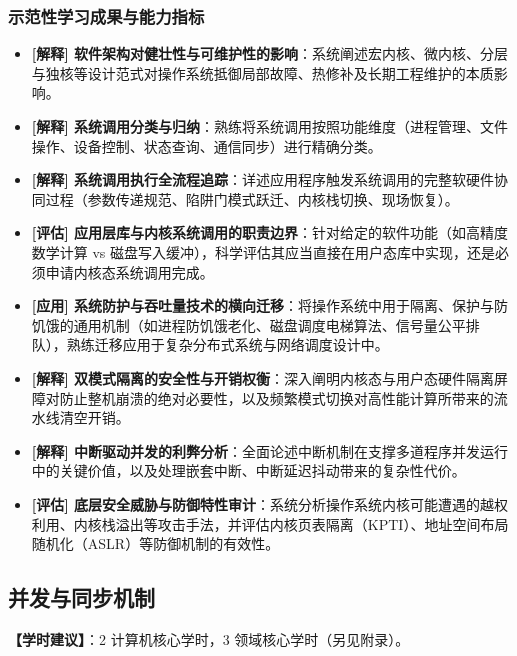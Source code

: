 \subsubsection{示范性学习成果与能力指标}
\begin{itemize}\setlength{\itemsep}{0pt}\setlength{\parskip}{0pt}
    \item \textbf{[解释] 软件架构对健壮性与可维护性的影响}：系统阐述宏内核、微内核、分层与独核等设计范式对操作系统抵御局部故障、热修补及长期工程维护的本质影响。
    \item \textbf{[解释] 系统调用分类与归纳}：熟练将系统调用按照功能维度（进程管理、文件操作、设备控制、状态查询、通信同步）进行精确分类。
    \item \textbf{[解释] 系统调用执行全流程追踪}：详述应用程序触发系统调用的完整软硬件协同过程（参数传递规范、陷阱门模式跃迁、内核栈切换、现场恢复）。
    \item \textbf{[评估] 应用层库与内核系统调用的职责边界}：针对给定的软件功能（如高精度数学计算 vs 磁盘写入缓冲），科学评估其应当直接在用户态库中实现，还是必须申请内核态系统调用完成。
    \item \textbf{[应用] 系统防护与吞吐量技术的横向迁移}：将操作系统中用于隔离、保护与防饥饿的通用机制（如进程防饥饿老化、磁盘调度电梯算法、信号量公平排队），熟练迁移应用于复杂分布式系统与网络调度设计中。
    \item \textbf{[解释] 双模式隔离的安全性与开销权衡}：深入阐明内核态与用户态硬件隔离屏障对防止整机崩溃的绝对必要性，以及频繁模式切换对高性能计算所带来的流水线清空开销。
    \item \textbf{[解释] 中断驱动并发的利弊分析}：全面论述中断机制在支撑多道程序并发运行中的关键价值，以及处理嵌套中断、中断延迟抖动带来的复杂性代价。
    \item \textbf{[评估] 底层安全威胁与防御特性审计}：系统分析操作系统内核可能遭遇的越权利用、内核栈溢出等攻击手法，并评估内核页表隔离（KPTI）、地址空间布局随机化（ASLR）等防御机制的有效性。
\end{itemize}

\subsection{并发与同步机制}
\textbf{【学时建议】}：2 计算机核心学时，3 领域核心学时（另见附录）。

